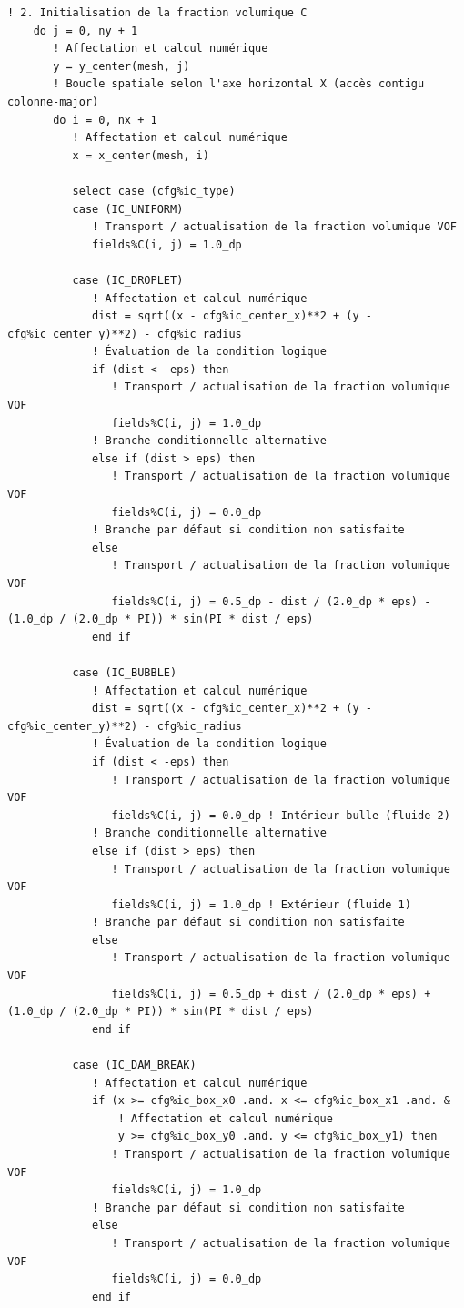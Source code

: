 \documentclass[10pt,a4paper,oneside]{book}
\begin{document}
\begin{lstlisting}[language={[95]Fortran}]
    ! 2. Initialisation de la fraction volumique C
    do j = 0, ny + 1
       ! Affectation et calcul numérique
       y = y_center(mesh, j)
       ! Boucle spatiale selon l'axe horizontal X (accès contigu colonne-major)
       do i = 0, nx + 1
          ! Affectation et calcul numérique
          x = x_center(mesh, i)

          select case (cfg%ic_type)
          case (IC_UNIFORM)
             ! Transport / actualisation de la fraction volumique VOF
             fields%C(i, j) = 1.0_dp

          case (IC_DROPLET)
             ! Affectation et calcul numérique
             dist = sqrt((x - cfg%ic_center_x)**2 + (y - cfg%ic_center_y)**2) - cfg%ic_radius
             ! Évaluation de la condition logique
             if (dist < -eps) then
                ! Transport / actualisation de la fraction volumique VOF
                fields%C(i, j) = 1.0_dp
             ! Branche conditionnelle alternative
             else if (dist > eps) then
                ! Transport / actualisation de la fraction volumique VOF
                fields%C(i, j) = 0.0_dp
             ! Branche par défaut si condition non satisfaite
             else
                ! Transport / actualisation de la fraction volumique VOF
                fields%C(i, j) = 0.5_dp - dist / (2.0_dp * eps) - (1.0_dp / (2.0_dp * PI)) * sin(PI * dist / eps)
             end if

          case (IC_BUBBLE)
             ! Affectation et calcul numérique
             dist = sqrt((x - cfg%ic_center_x)**2 + (y - cfg%ic_center_y)**2) - cfg%ic_radius
             ! Évaluation de la condition logique
             if (dist < -eps) then
                ! Transport / actualisation de la fraction volumique VOF
                fields%C(i, j) = 0.0_dp ! Intérieur bulle (fluide 2)
             ! Branche conditionnelle alternative
             else if (dist > eps) then
                ! Transport / actualisation de la fraction volumique VOF
                fields%C(i, j) = 1.0_dp ! Extérieur (fluide 1)
             ! Branche par défaut si condition non satisfaite
             else
                ! Transport / actualisation de la fraction volumique VOF
                fields%C(i, j) = 0.5_dp + dist / (2.0_dp * eps) + (1.0_dp / (2.0_dp * PI)) * sin(PI * dist / eps)
             end if

          case (IC_DAM_BREAK)
             ! Affectation et calcul numérique
             if (x >= cfg%ic_box_x0 .and. x <= cfg%ic_box_x1 .and. &
                 ! Affectation et calcul numérique
                 y >= cfg%ic_box_y0 .and. y <= cfg%ic_box_y1) then
                ! Transport / actualisation de la fraction volumique VOF
                fields%C(i, j) = 1.0_dp
             ! Branche par défaut si condition non satisfaite
             else
                ! Transport / actualisation de la fraction volumique VOF
                fields%C(i, j) = 0.0_dp
             end if


\end{lstlisting}
\end{document}
